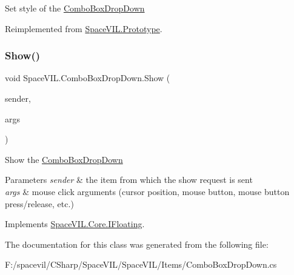 Set style of the \mbox{\hyperlink{class_space_v_i_l_1_1_combo_box_drop_down}{Combo\+Box\+Drop\+Down}} 



Reimplemented from \mbox{\hyperlink{class_space_v_i_l_1_1_prototype_ae96644a6ace490afb376fb542161e541}{Space\+V\+I\+L.\+Prototype}}.

\mbox{\label{class_space_v_i_l_1_1_combo_box_drop_down_a03c88461af5f952883e306c1e5da555b}} 
\subsubsection{\texorpdfstring{Show()}{Show()}}
{\footnotesize\ttfamily void Space\+V\+I\+L.\+Combo\+Box\+Drop\+Down.\+Show (\begin{DoxyParamCaption}\item[{\mbox{\hyperlink{interface_space_v_i_l_1_1_core_1_1_i_item}{I\+Item}}}]{sender,  }\item[{\mbox{\hyperlink{class_space_v_i_l_1_1_core_1_1_mouse_args}{Mouse\+Args}}}]{args }\end{DoxyParamCaption})\hspace{0.3cm}{\ttfamily [inline]}}



Show the \mbox{\hyperlink{class_space_v_i_l_1_1_combo_box_drop_down}{Combo\+Box\+Drop\+Down}} 


\begin{DoxyParams}{Parameters}
{\em sender} & the item from which the show request is sent \\
\hline
{\em args} & mouse click arguments (cursor position, mouse button, mouse button press/release, etc.) \\
\hline
\end{DoxyParams}


Implements \mbox{\hyperlink{interface_space_v_i_l_1_1_core_1_1_i_floating}{Space\+V\+I\+L.\+Core.\+I\+Floating}}.



The documentation for this class was generated from the following file\+:\begin{DoxyCompactItemize}
\item 
F\+:/spacevil/\+C\+Sharp/\+Space\+V\+I\+L/\+Space\+V\+I\+L/\+Items/Combo\+Box\+Drop\+Down.\+cs\end{DoxyCompactItemize}
